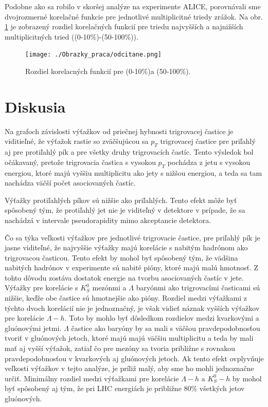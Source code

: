 \documentclass[thesismargins, thesislinespacing]{rnthesis}
\begin{document}
Podobne ako sa robilo v skoršej analýze na experimente ALICE, porovnávali sme dvojrozmerné korelačné funkcie pre jednotlivé multiplicitné triedy zrážok. Na obr. \ref{multroz} je zobrazený rozdiel korelačných funkcií pre triedu najvyšších a najnižších multiplicitných tried ((0-10\%)-(50-100\%)).

\begin{figure}[hbtp!]
	\centering
	\texttt{[image: ./Obrazky\_praca/odcitane.png]}
	\caption{Rozdiel korelacných funkcií pre (0-10\%)a (50-100\%).}
	\label{multroz}
\end{figure}
\chapter{Diskusia}
 
Na grafoch závislosti výťažkov od priečnej hybnosti trigrovacej častice je viditieľné, že výťažok rastie so zväčšujúcou sa $p_T$ trigrovacej častice pre priľahlý aj pre protiľahlý pík a pre všetky druhy trigrovacích častíc. Tento výsledok bol očákavaný, pretože trigrovacia častica s vysokou $p_T$ pochádza z jetu s vysokou energiou, ktoré majú vyššiu multiplicitu ako jety s nižšou energiou, a teda sa tam nachádza väčší počet asociovaných častíc. 

Výťažky protiľahlých píkov sú nižšie ako priľahlých. Tento efekt môže byť spôsobený tým, že protiľahlý jet nie je viditeľný v detektore v prípade, že sa nachádzá v intervale pseudorapidity mimo akceptancie detektora. 

Čo sa týka veľkosti výťažkov pre jednotlivé trigrovacie častice, pre priľahlý pík je jasne viditeľné, že najvyššie výťažky majú korelácie s nabitým hadrónom ako trigrovacou časticou. Tento efekt by mohol byť spôsobený tým, že vädšina nabitých hadrónov v experimente sú nabité pióny, ktoré majú malú hmotnosť. Z tohto dôvodu zostáva dostatok energie na tvorbu asociovaných častíc v jete. Výťažky pre korelácie s $K^0_S$ mezónmi a $\Lambda$ baryónmi ako trigrovacími časticami sú nižšie, keďže obe častice sú hmotnejšie ako pióny. Rozdiel medzi výťažkami z týchto dvoch korelácií nie je jednoznačný, je však vidieť náznak vyšších výťažkov pre korelácie $\Lambda - h$. Toto by mohlo byť dôsledkom rozdielov medzi kvarkovými a gluónovými jetmi. $\Lambda$ častice ako baryóny by sa mali s väčšou pravdepodobnosťou tvoriť v gluónových jetoch, ktoré majú majú väčšiu multiplicitu a teda by mali mať aj vyšší výťažok, zatiaľ čo pre mezóny sa tvoria približne s rovnakou pravdepodobnosťou v kvarkových aj gluónových jetoch. Ak tento efekt ovplyvňuje veľkosti výťažkov v tejto analýze, je príliž malý, aby sme ho mohli jednoznačne určiť. Minimálny rozdiel medzi výťažkami pre korelácie  $\Lambda - h$ a $K^0_S-h$ by mohol byť spôsobený aj tým, že pri LHC energiách je približne 80\% všetkých jetov gluónových. 
\end{document}
